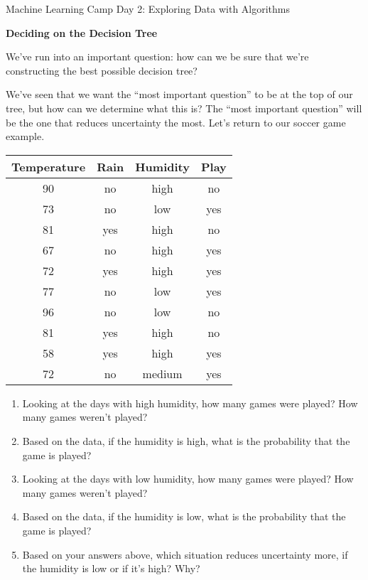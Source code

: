 \documentclass[10pt]{article}
\newcommand{\headerclass}{Machine Learning Camp}
\newcommand{\headersection}{Day 2: Exploring Data with Algorithms}
\newcommand{\headertitle}{Deciding on the Decision Tree}
\begin{document}
\headerclass\xspace {} \headersection\\
\begin{center}{ \large \textbf{\headertitle} }\end{center}

We've run into an important question: how can we be sure that we're constructing the best possible decision tree?

We've seen that we want the ``most important question'' to be at the top of our tree, but how can we determine what this is? The ``most important question'' will be the one that reduces uncertainty the most. Let's return to our soccer game example.

\begin{center}

\begin{tabular}{|c|c|c|c|}
\hline
Temperature &
Rain &
Humidity &
Play \\
\hline
90 &
no &
high &
no \\
73&
no&
low&
yes \\
81&
yes&
high&
no \\
67&
no&
high&
yes\\
72&
yes&
high&
yes\\
77&
no&
low&
yes\\
96 &
no&
low&
no\\
81&
yes&
high&
no\\
58&
yes&
high&
yes\\
72&
no&
medium&
yes\\
\hline
\end{tabular}
\end{center}

\begin{enumerate}
\item Looking at the days with high humidity, how many games were played? How many games weren't played?
\vspace{1cm}

\item Based on the data, if the humidity is high, what is the probability that the game is played?
\vspace{1cm}

\item Looking at the days with low humidity, how many games were played? How many games weren't played?
\vspace{1cm}

\item Based on the data, if the humidity is low, what is the probability that the game is played?
\vspace{1cm}

\item Based on your answers above, which situation reduces uncertainty more, if the humidity is low or if it's high? Why?
\vfill

\end{enumerate}
\end{document}
